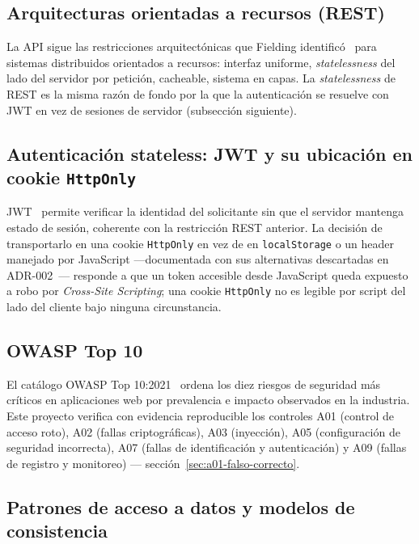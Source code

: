 \documentclass[11pt,a4paper]{article}
\begin{document}
\subsection{Arquitecturas orientadas a recursos (REST)}

La API sigue las restricciones arquitectónicas que Fielding
identificó~\cite{fielding2000} para sistemas distribuidos orientados a
recursos: interfaz uniforme, \emph{statelessness} del lado del servidor
por petición, cacheable, sistema en capas. La \emph{statelessness} de REST
es la misma razón de fondo por la que la autenticación se resuelve con JWT
en vez de sesiones de servidor (subsección siguiente).

\subsection{Autenticación stateless: JWT y su ubicación en cookie \texttt{HttpOnly}}

JWT~\cite{rfc7519} permite verificar la identidad del solicitante sin que
el servidor mantenga estado de sesión, coherente con la restricción REST
anterior. La decisión de transportarlo en una cookie \texttt{HttpOnly} en
vez de en \texttt{localStorage} o un header manejado por JavaScript
—documentada con sus alternativas descartadas en
ADR-002~\cite{nygard2011adr}— responde a que un token accesible desde
JavaScript queda expuesto a robo por \emph{Cross-Site Scripting}; una
cookie \texttt{HttpOnly} no es legible por script del lado del cliente
bajo ninguna circunstancia.

\subsection{OWASP Top 10}

El catálogo OWASP Top 10:2021~\cite{owasp2021} ordena los diez riesgos de
seguridad más críticos en aplicaciones web por prevalencia e impacto
observados en la industria. Este proyecto verifica con evidencia
reproducible los controles A01 (control de acceso roto), A02 (fallas
criptográficas), A03 (inyección), A05 (configuración de seguridad
incorrecta), A07 (fallas de identificación y autenticación) y A09
(fallas de registro y monitoreo) — sección~\ref{sec:a01-falso-correcto}.

\subsection{Patrones de acceso a datos y modelos de consistencia}
\end{document}
